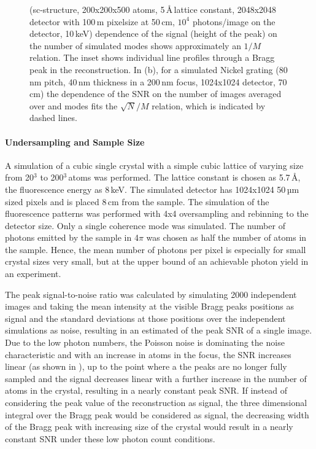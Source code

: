 \begin{figure}
{	(sc-structure, 200x200x500 atoms, 5\,\AA\,lattice constant, 2048x2048 detector with 100\,\textmu m pixelsize at 50\,cm, $10^4$ photons/image on the detector, 10\,keV) dependence of the signal (height of the peak) on the number of simulated modes shows approximately an $1/M$ relation.  The inset shows individual line profiles through a Bragg peak in the reconstruction. In (b), for a simulated Nickel grating (80\,nm pitch, 40\,nm thickness in a 200\,nm focus, 1024x1024 detector, 70\,cm) the dependence of the SNR on the number of images averaged over and modes fits the $\sqrt{N}/M$ relation, which is indicated by dashed lines.}
\end{figure}

\paragraph{Undersampling and  Sample Size}


A simulation of a cubic single crystal with a simple cubic lattice of varying size from 20$^3$ to 200$^3$\,atoms was performed. The lattice constant is chosen as 5.7\,\AA, the fluorescence energy as 8\,keV. The simulated detector has 1024x1024 50\,µm sized pixels and is placed 8\,cm from the  sample. The simulation of the fluorescence patterns was performed with 4x4 oversampling and rebinning to the detector size. Only a single coherence mode was simulated. The number of photons emitted by the sample in 4$\pi$ was chosen as half the number of atoms in the sample. Hence, the mean number of photons per pixel is especially for small crystal sizes very small, but at the upper bound of an achievable photon yield in an experiment.

The peak signal-to-noise ratio was calculated by simulating 2000 independent images  and taking the mean intensity at the visible Bragg peaks positions as signal and the standard deviations at those positions over the independent simulations as noise, resulting in an estimated of the peak SNR of a single image.
Due to the low photon numbers, the Poisson noise is dominating the noise characteristic and with an increase in atoms in the focus, the SNR increases linear (as shown in ), up to the point where a the peaks are no longer fully sampled and the signal decreases linear with a further increase in the number of atoms in the crystal, resulting in a nearly constant peak SNR.
If instead of considering the peak value of the reconstruction as signal, the three dimensional integral over the Bragg peak would be considered as signal, the decreasing width of the Bragg peak with increasing size of the crystal would result in a nearly constant SNR under these low photon count conditions. 



